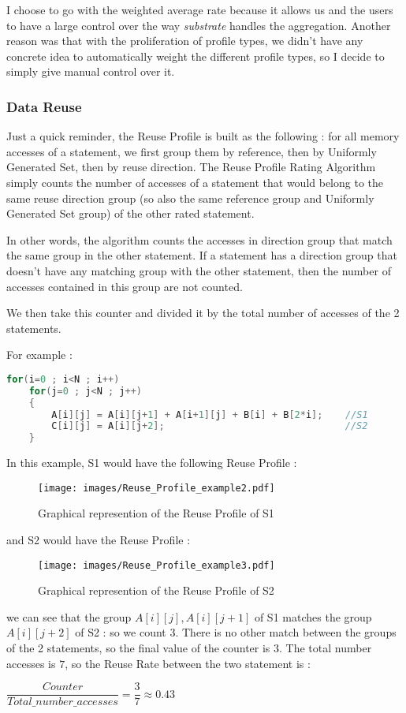 \documentclass[paper=a4, fontsize=11.5pt]{scrartcl}
\numberwithin{equation}{section}        %
\numberwithin{figure}{section}          %
\numberwithin{table}{section}               %
\begin{document}
    I choose to go with the weighted average rate because it allows us and the users
    to have a large control over the way \textit{substrate} handles the aggregation.
    Another reason was that with the proliferation of profile types, we didn't have
    any concrete idea to automatically weight the different profile types, so I decide
    to simply give manual control over it.
        \subsubsection{Data Reuse}
            Just a quick reminder, the Reuse Profile is built as the following : for all memory accesses of
            a statement, we first group them by reference, then by Uniformly Generated Set,
            then by reuse direction. The Reuse Profile Rating Algorithm simply counts
            the number of accesses of a statement that would belong to the same reuse
            direction group (so also the same reference group and Uniformly Generated Set group)
            of the other rated statement.
            
            In other words, the algorithm counts the accesses in direction group that match
            the same group in the other statement. If a statement has a direction group that doesn't
            have any matching group with the other statement, then the number of accesses contained
            in this group are not counted.

            We then take this counter and divided it by the total number of accesses of
            the 2 statements.

            For example :
\begin{lstlisting}[frame=single, language=C, caption={Reuse profile rating example}, label={lst:rp_example}]
for(i=0 ; i<N ; i++)
    for(j=0 ; j<N ; j++)
    {
        A[i][j] = A[i][j+1] + A[i+1][j] + B[i] + B[2*i];    //S1
        C[i][j] = A[i][j+2];                                //S2
    }
\end{lstlisting}
        In this example, S1 would have the following Reuse Profile :
\begin{figure}[H]
    \center
    \texttt{[image: images/Reuse\_Profile\_example2.pdf]}
    \caption{Graphical represention of the Reuse Profile of S1}
\end{figure}
            and S2 would have the Reuse Profile :
\begin{figure}[H]
    \center
    \texttt{[image: images/Reuse\_Profile\_example3.pdf]}
    \caption{Graphical represention of the Reuse Profile of S2}
\end{figure}
        we can see that the group ${A[i][j],A[i][j+1]}$ of S1 matches the group ${A[i][j+2]}$
        of S2 : so we count $3$. There is no other match between the groups of the 2 statements,
        so the final value of the counter is $3$. The total number accesses is $7$, so the
        Reuse Rate between the two statement is :
        \begin{center}
            $\dfrac{\mathit{Counter}}{\mathit{Total\_number\_accesses}} = \dfrac{3}{7} \approx 0.43$
        \end{center}
\end{document}
